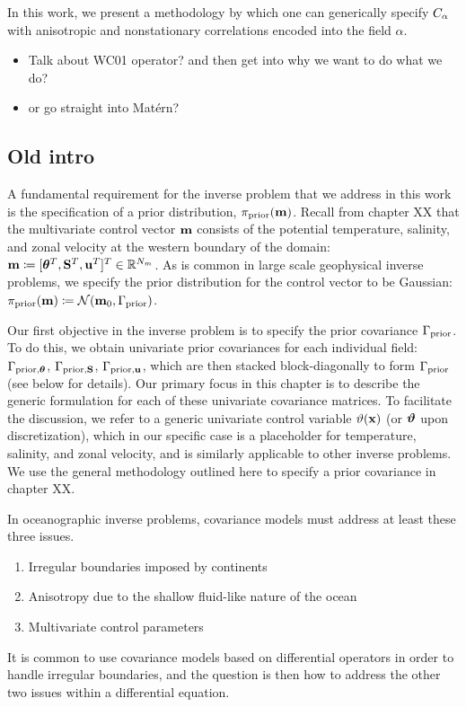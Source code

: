 In this work, we present a methodology by which one can generically specify $C_\alpha$
with anisotropic and nonstationary correlations encoded into the field $\alpha$.
\begin{itemize}
    \item Talk about WC01 operator? and then get into why we want to do what we
        do?
    \item or go straight into Mat\'ern?
\end{itemize}



\subsection{Old intro}
A fundamental requirement for the inverse problem that we address in this work
is the specification of a prior distribution, $\pi_{\text{prior}}(\mathbf{m})$.
Recall from chapter XX that the multivariate control vector
$\mathbf{m}$ consists of the
potential temperature, salinity, and zonal velocity at the western boundary of
the domain:
$\mathbf{m} \coloneqq [{\bm{\theta}}^T,\mathbf{S}^T,\mathbf{u}^T]^T \in\mathbb{R}^{N_m}$.
As is common in large scale geophysical inverse problems, we specify the prior
distribution for the control vector
to be Gaussian: $\pi_{\text{prior}}(\mathbf{m}) \coloneqq \mathcal{N}(\mathbf{m}_0, \Gamma_{\text{prior}})$.

Our first objective in the inverse problem is to specify the prior
covariance $\Gamma_{\text{prior}}$.
To do this, we obtain univariate prior covariances for
each individual field: $\Gamma_{\text{prior,}{\bm{\theta}}}$, $\Gamma_{\text{prior,}\mathbf{S}}$,
$\Gamma_{\text{prior,}\mathbf{u}}$, which are then stacked block-diagonally to form
$\Gamma_{\text{prior}}$ (see below for details).
Our primary focus in this chapter is to describe the generic formulation for
each of these univariate covariance matrices.
To facilitate the discussion, we refer to a generic univariate control variable
$\vartheta(\mathbf{x})$ (or $\bm{\vartheta}$ upon discretization), which in our specific case is a
placeholder for temperature, salinity, and zonal velocity, and is similarly
applicable to other inverse problems.
We use the general methodology outlined here to specify a prior covariance in
chapter XX.

In oceanographic inverse problems, covariance models must address at least
these three issues.
\begin{enumerate}
    \item Irregular boundaries imposed by continents
    \item Anisotropy due to the shallow fluid-like nature of the ocean
    \item Multivariate control parameters
\end{enumerate}
It is common to use covariance models based on differential operators in order
to handle irregular boundaries, and the question is then how to address the
other two issues within a differential equation.

